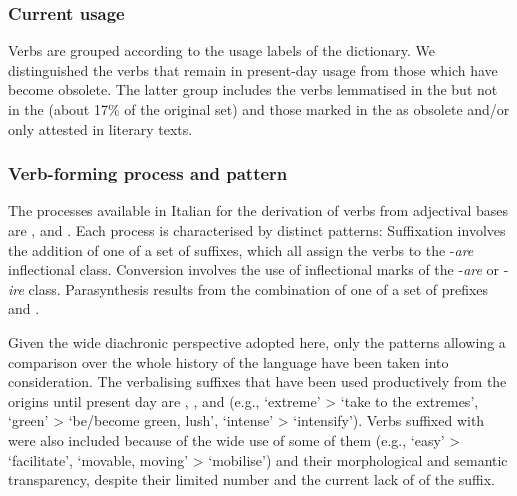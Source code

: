 \documentclass[output=paper,colorlinks,citecolor=brown]{langscibook}
\begin{document}
 \subsubsection{Current usage}
 
 Verbs are grouped according to the usage labels of the  dictionary. We distinguished the verbs that remain in present-day usage from those which have become obsolete. The latter group includes the verbs lemmatised in the  but not in the   (about 17\% of the original set) and those marked in the  as obsolete and/or only attested in literary texts.


\subsubsection{Verb-forming process and pattern}

The processes available in Italian for the derivation of verbs from adjectival bases are ,  and . Each process is characterised by distinct patterns: Suffixation involves the addition of one of a set of suffixes, which all assign the verbs to the -\textit{are} inflectional class. Conversion  involves the use of inflectional marks of the -\textit{are} or -\textit{ire} class. Parasynthesis results from the combination of one of a set of prefixes and . 

Given the wide diachronic perspective adopted here, only the patterns allowing a comparison over the whole history of the language have been taken into consideration. The verbalising suffixes that have been used productively from the origins until present day are , , and  (e.g.,  ‘extreme’ >  ‘take to the extremes’,  ‘green’ >  ‘be/become green, lush’,  ‘intense’ >  ‘intensify’). Verbs suffixed with  were also included because of the wide use of some of them (e.g.,  ‘easy’ >   ‘facilitate’,  ‘movable, moving’ >  ‘mobilise’) and their morphological and semantic transparency, despite their limited number and the current lack of  of the suffix.
\end{document}

